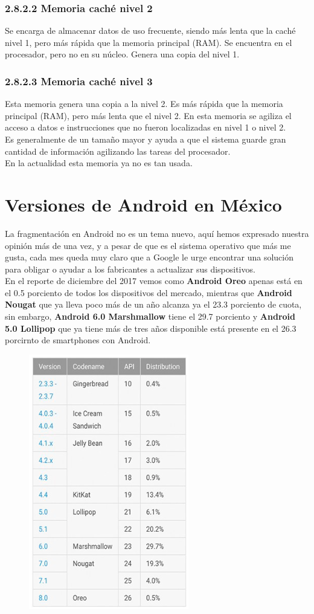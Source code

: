 \subsubsection{2.8.2.2 Memoria caché nivel 2}
Se encarga de almacenar datos de uso frecuente, siendo más lenta que la caché nivel 1, pero más rápida que la memoria principal (RAM). Se encuentra en el procesador, pero no en su núcleo. Genera una copia del nivel 1.
\subsubsection{2.8.2.3 Memoria caché nivel 3}
Esta memoria genera una copia a la nivel 2. Es más rápida que la memoria principal (RAM), pero más lenta que el nivel 2. En esta memoria se agiliza el acceso a datos e instrucciones que no fueron localizadas en nivel 1 o nivel 2.\\Es generalmente de un tamaño mayor y ayuda a que el sistema guarde gran cantidad de información agilizando las tareas del procesador.\\En la actualidad esta memoria ya no es tan usada.
\section{Versiones de Android en México}
La fragmentación en Android no es un tema nuevo, aquí hemos expresado nuestra opinión más de una vez, y a pesar de que es el sistema operativo que más me gusta, cada mes queda muy claro que a Google le urge encontrar una solución para obligar o ayudar a los fabricantes a actualizar sus dispositivos.\\En el reporte de diciembre del 2017  vemos como {\bf Android Oreo} apenas está en el 0.5 porciento de todos los dispositivos del mercado, mientras que {\bf Android Nougat} que ya lleva poco más de un año alcanza ya el 23.3 porciento de cuota, sin embargo, {\bf Android 6.0 Marshmallow} tiene el 29.7 porciento y {\bf Android 5.0 Lollipop} que ya tiene más de tres años disponible está presente en el 26.3 porcirnto de smartphones con Android.
\begin{figure}[htbp]
	\begin{center}
		\includegraphics[width=.3\textwidth]{images/imgmarco/versiones}
		\label{fig:versiones}
	\end{center}
\end{figure}



